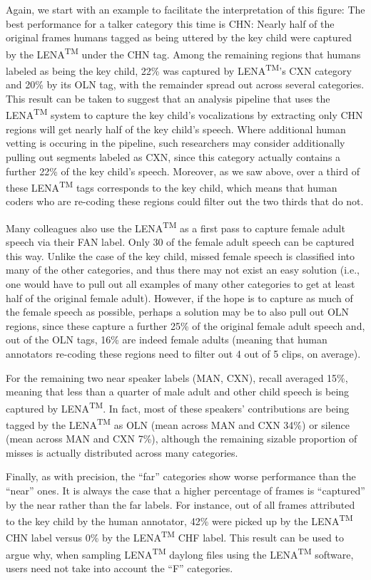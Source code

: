 \documentclass[english,floatsintext,man]{apa6}
\begin{document}
Again, we start with an example to facilitate the interpretation of this
figure: The best performance for a talker category this time is CHN:
Nearly half of the original frames humans tagged as being uttered by the
key child were captured by the LENA\textsuperscript{TM} under the CHN
tag. Among the remaining regions that humans labeled as being the key
child, 22\% was captured by LENA\textsuperscript{TM}'s CXN category and
20\% by its OLN tag, with the remainder spread out across several
categories. This result can be taken to suggest that an analysis
pipeline that uses the LENA\textsuperscript{TM} system to capture the
key child's vocalizations by extracting only CHN regions will get nearly
half of the key child's speech. Where additional human vetting is
occuring in the pipeline, such researchers may consider additionally
pulling out segments labeled as CXN, since this category actually
contains a further 22\% of the key child's speech. Moreover, as we saw
above, over a third of these LENA\textsuperscript{TM} tags corresponds
to the key child, which means that human coders who are re-coding these
regions could filter out the two thirds that do not.

Many colleagues also use the LENA\textsuperscript{TM} as a first pass to
capture female adult speech via their FAN label. Only 30 of the female
adult speech can be captured this way. Unlike the case of the key child,
missed female speech is classified into many of the other categories,
and thus there may not exist an easy solution (i.e., one would have to
pull out all examples of many other categories to get at least half of
the original female adult). However, if the hope is to capture as much
of the female speech as possible, perhaps a solution may be to also pull
out OLN regions, since these capture a further 25\% of the original
female adult speech and, out of the OLN tags, 16\% are indeed female
adults (meaning that human annotators re-coding these regions need to
filter out 4 out of 5 clips, on average).

For the remaining two near speaker labels (MAN, CXN), recall averaged
15\%, meaning that less than a quarter of male adult and other child
speech is being captured by LENA\textsuperscript{TM}. In fact, most of
these speakers' contributions are being tagged by the
LENA\textsuperscript{TM} as OLN (mean across MAN and CXN 34\%) or
silence (mean across MAN and CXN 7\%), although the remaining sizable
proportion of misses is actually distributed across many categories.

Finally, as with precision, the \enquote{far} categories show worse
performance than the \enquote{near} ones. It is always the case that a
higher percentage of frames is \enquote{captured} by the near rather
than the far labels. For instance, out of all frames attributed to the
key child by the human annotator, 42\% were picked up by the
LENA\textsuperscript{TM} CHN label versus 0\% by the
LENA\textsuperscript{TM} CHF label. This result can be used to argue
why, when sampling LENA\textsuperscript{TM} daylong files using the
LENA\textsuperscript{TM} software, users need not take into account the
\enquote{F} categories.
\end{document}
